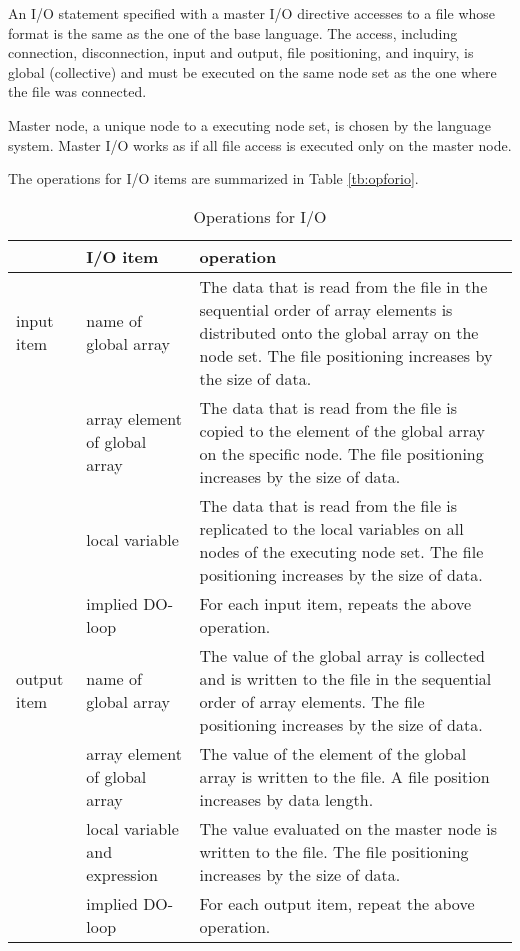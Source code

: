    An I/O statement specified with a master I/O directive accesses to a
   file whose format is the same as the one of the base language.
   The access, including connection, disconnection, input and output,
   file positioning, and inquiry, is global (collective) and must be
   executed on the same node set as the one where the file was
   connected. 

   Master node, a unique node to a executing node set, is chosen by the
   language system.
   Master I/O works as if all file access is executed only on the master
   node.

   The operations for I/O items are summarized in Table \ref{tb:opforio}.

   \begin{table}[h]
    \begin{center}
    \caption{Operations for I/O}
    \label{tb:opforio}
     \begin{tabular}{|l|p{40mm}|p{80mm}|}
      \hline
      \multicolumn{1}{|c}{ }  & {\bf I/O item} & {\bf operation} \\
      \hline
      input item & name of global array & The data that is read 
	      from the file in the sequential order of array elements is distributed onto 
	      the global array on the node set. The file positioning increases by
	      the size of data. \\
      \cline{2-3}
      & array element of global array &  The data that is read from the file
	      is copied to the element of the global array on the specific node.
	      The file positioning increases by the size of data. \\
      \cline{2-3}
      & local variable & The data that is read from the file is replicated to the
	      local variables on all nodes of the executing node
	      set. The file positioning increases by the size of data. \\
      \cline{2-3}
      & implied DO-loop & For each input item, repeats the above operation. \\
      \hline
      output item & name of global array & The value of the
	      global array is collected and is written to the
	      file in the sequential order of array elements. The file
	      positioning increases by the size of data. \\
      \cline{2-3}
      & array element of global array &  The value of the element of the
	      global array is written to the
	      file. A file position increases by data length. \\
      \cline{2-3}
      & local variable and expression & The value evaluated on the master node
	      is written to the file. The file positioning increases by
	      the size of data. \\
      \cline{2-3}
      & implied DO-loop & For each output item, repeat the above operation. \\
      \hline
      \end{tabular}
     \end{center}
    \label{tb:aaa}
   \end{table}

